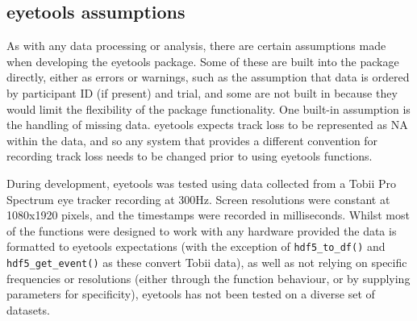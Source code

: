 \documentclass[
  man,
  floatsintext,
  longtable,
  nolmodern,
  notxfonts,
  notimes,
  colorlinks=true,linkcolor=blue,citecolor=blue,urlcolor=blue]{apa7}
\begin{document}
\begin{figure}[H]
\begin{minipage}{0.33\linewidth}
\subcaption{\label{fig-spatial-sac}}


\end{minipage}%

\end{figure}%

\subsection{eyetools assumptions}\label{eyetools-assumptions}

As with any data processing or analysis, there are certain assumptions
made when developing the eyetools package. Some of these are built into
the package directly, either as errors or warnings, such as the
assumption that data is ordered by participant ID (if present) and
trial, and some are not built in because they would limit the
flexibility of the package functionality. One built-in assumption is the
handling of missing data. eyetools expects track loss to be represented
as NA within the data, and so any system that provides a different
convention for recording track loss needs to be changed prior to using
eyetools functions.

During development, eyetools was tested using data collected from a
Tobii Pro Spectrum eye tracker recording at 300Hz. Screen resolutions
were constant at 1080x1920 pixels, and the timestamps were recorded in
milliseconds. Whilst most of the functions were designed to work with
any hardware provided the data is formatted to eyetools expectations
(with the exception of \texttt{hdf5\_to\_df()} and
\texttt{hdf5\_get\_event()} as these convert Tobii data), as well as not
relying on specific frequencies or resolutions (either through the
function behaviour, or by supplying parameters for specificity),
eyetools has not been tested on a diverse set of datasets.
\end{document}
